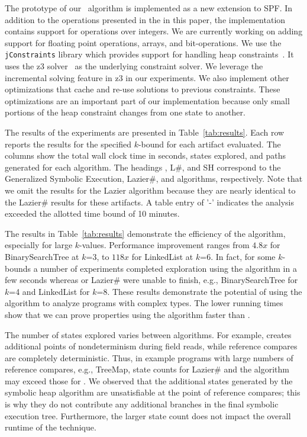 The prototype of our~\symtxt{} algorithm is implemented as a new
extension to SPF.  In addition to the operations presented in the in
this paper, the implementation contains support for operations over
integers.  We are currently working on adding support for floating
point operations, arrays, and bit-operations.  We use the
\texttt{jConstraints} library which provides support for handling heap
constraints~\cite{ase2014-ghilrr,jpf2014-dghirr}. It uses the z3
solver~\cite{deMouraBjorner08Z3} as the underlying constraint
solver. We leverage the incremental solving feature in z3 in our
experiments. We also implement other optimizations that cache and
re-use solutions to previous constraints. These optimizations are an
important part of our implementation because only small portions of
the heap constraint changes from one state to another.

The results of the experiments are presented in Table~\ref{tab:results}. 
Each row reports the results for the specified $k$-bound 
for each artifact evaluated. The columns show the total
wall clock time in seconds, states explored, and paths generated for
each algorithm. The headings \gsetxt{}, L\#, and SH correspond
to the Generalized Symbolic Execution, Lazier\#, and \symtxt{}
algorithms, respectively. Note that we omit the results for
the Lazier algorithm because they are nearly identical to the Lazier\#
results for these artifacts. A table entry of  '-' indicates the analysis
exceeded the allotted time bound of 10 minutes.

The results in Table~\ref{tab:results} demonstrate the efficiency of the 
\symtxt{} algorithm, especially for
large $k$-values. Performance improvement ranges from $4.8x$ for
BinarySearchTree at $k$=3, to $118x$ for LinkedList at $k$=6. In fact,
for some $k$-bounds a number of experiments completed exploration
using the \symtxt{} algorithm in a few seconds whereas \gsetxt{} or Lazier\# were
unable to finish, e.g., BinarySearchTree for $k$=4 and LinkedList for
$k$=8. These results demonstrate the potential of using the \symtxt{} algorithm 
to analyze programs with complex types. The lower running times
show that we can prove properties using the \symtxt{} algorithm 
faster than \gsetxt{}.

The number of states explored varies between algorithms. For example,
\gsetxt{} creates additional points of nondeterminism during field reads, 
while reference compares are completely deterministic. Thus, in
example programs with large numbers of reference compares, e.g.,
TreeMap, state counts for Lazier\# and the \symtxt{} algorithm may
exceed those for \gsetxt{}. We observed that the additional states
generated by the symbolic heap algorithm are unsatisfiable at the point
of reference compares; this is why they do not contribute any
additional branches in the final symbolic execution tree. Furthermore,
the larger state count does not impact the overall runtime of the
technique.


